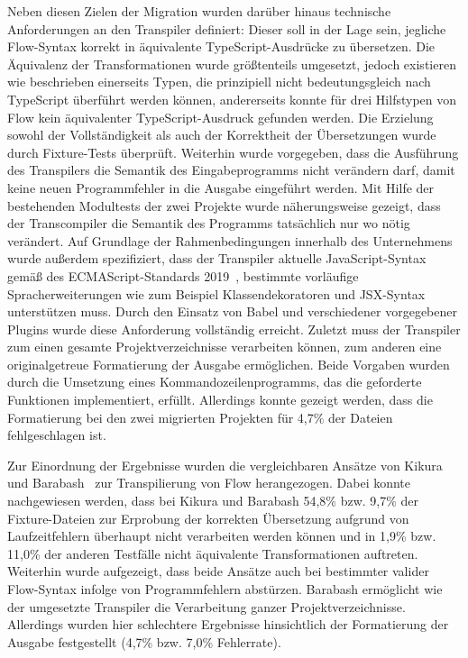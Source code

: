 Neben diesen Zielen der Migration wurden darüber hinaus technische Anforderungen an den Transpiler definiert: Dieser soll in der Lage sein, jegliche Flow-Syntax korrekt in äquivalente TypeScript-Ausdrücke zu übersetzen. Die Äquivalenz der Transformationen wurde größtenteils umgesetzt, jedoch existieren wie beschrieben einerseits Typen, die prinzipiell nicht bedeutungsgleich nach TypeScript überführt werden können, andererseits konnte für drei Hilfstypen von Flow kein äquivalenter TypeScript-Ausdruck gefunden werden. Die Erzielung sowohl der Vollständigkeit als auch der Korrektheit der Übersetzungen wurde durch Fixture-Tests überprüft.
Weiterhin wurde vorgegeben, dass die Ausführung des Transpilers die Semantik des Eingabeprogramms nicht verändern darf, damit keine neuen Programmfehler in die Ausgabe eingeführt werden. Mit Hilfe der bestehenden Modultests der zwei Projekte wurde näherungsweise gezeigt, dass der Transcompiler die Semantik des Programms tatsächlich nur wo nötig verändert.
Auf Grundlage der Rahmenbedingungen innerhalb des Unternehmens wurde außerdem spezifiziert, dass der Transpiler aktuelle JavaScript-Syntax gemäß des ECMAScript-Standards 2019~\autocite{ECMASCRIPT:2019}, bestimmte vorläufige Spracherweiterungen wie zum Beispiel Klassendekoratoren und JSX-Syntax unterstützen muss. Durch den Einsatz von Babel und verschiedener vorgegebener Plugins wurde diese Anforderung vollständig erreicht.
Zuletzt muss der Transpiler zum einen gesamte Projektverzeichnisse verarbeiten können, zum anderen eine originalgetreue Formatierung der Ausgabe ermöglichen. Beide Vorgaben wurden durch die Umsetzung eines Kommandozeilenprogramms, das die geforderte Funktionen implementiert, erfüllt. Allerdings konnte gezeigt werden, dass die Formatierung bei den zwei migrierten Projekten für 4,7\% der Dateien fehlgeschlagen ist.

Zur Einordnung der Ergebnisse wurden die vergleichbaren Ansätze von Kikura~\autocite{KIKURA:FLOW_TO_TS} und Barabash~\autocite{BARABASH:FLOW_TO_TS} zur Transpilierung von Flow herangezogen. Dabei konnte nachgewiesen werden, dass bei Kikura und Barabash 54,8\% bzw. 9,7\% der Fixture-Dateien zur Erprobung der korrekten Übersetzung aufgrund von Laufzeitfehlern überhaupt nicht verarbeiten werden können und in 1,9\% bzw. 11,0\% der anderen Testfälle nicht äquivalente Transformationen auftreten. Weiterhin wurde aufgezeigt, dass beide Ansätze auch bei bestimmter valider Flow-Syntax infolge von Programmfehlern abstürzen. Barabash ermöglicht wie der umgesetzte Transpiler die Verarbeitung ganzer Projektverzeichnisse. Allerdings wurden hier schlechtere Ergebnisse hinsichtlich der Formatierung der Ausgabe festgestellt (4,7\% bzw. 7,0\% Fehlerrate).

